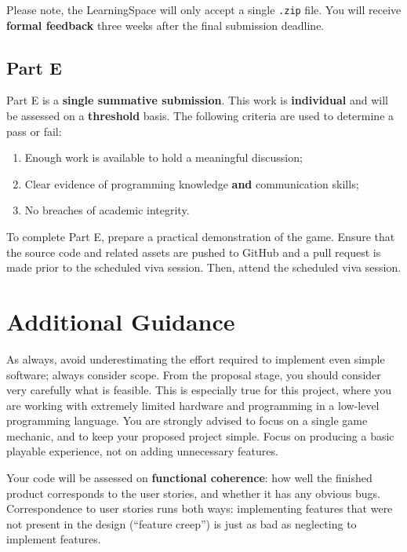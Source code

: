 \documentclass{../../fal_assignment}
\begin{document}
Please note, the LearningSpace will only accept a single \texttt{.zip} file. You will receive \textbf{formal feedback} three weeks after the final submission deadline.

\subsection*{Part E}

Part E is a \textbf{single summative submission}. This work is \textbf{individual} and will be assessed on a \textbf{threshold} basis.  The following criteria are used to determine a pass or fail:

\begin{enumerate}[label=(\alph*)]
	\item Enough work is available to hold a meaningful discussion;
	\item Clear evidence of programming knowledge \textbf{and} communication skills;
	\item No breaches of academic integrity.
\end{enumerate}

To complete Part E, prepare a practical demonstration of the game. Ensure that the source code and related assets are pushed to GitHub and a pull request is made prior to the scheduled viva session. Then, attend the scheduled viva session.

\section*{Additional Guidance}

As always, avoid underestimating the effort required to implement even simple software; always consider scope.
From the proposal stage, you should consider very carefully what is feasible.
This is especially true for this project, where you are working with extremely limited hardware
and programming in a low-level programming language.
You are strongly advised to focus on a single game mechanic,
and to keep your proposed project simple.
Focus on producing a basic playable experience, not on adding unnecessary features.

Your code will be assessed on \textbf{functional coherence}:
how well the finished product corresponds to the user stories,
and whether it has any obvious bugs.
Correspondence to user stories runs both ways:
implementing features that were not present in the design (``feature creep'')
is just as bad as neglecting to implement features.
\end{document}

